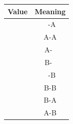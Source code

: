 \documentclass[11pt,english,BCOR10mm,DIV=14,bibliography=totoc,parskip=false,smallheadings,
    headexclude,footexclude,twoside]{pst-doc}
\begin{document}
\begin{center}
\begin{tabular}{@{}lc@{}}%
    Value & Meaning \\[2pt]\hline
    \Lnotation{-{>}>}   & \ -A \\
    \Lnotation{{<}<-{>}>} & A-A\\
    \Lnotation{{<}<-}   & A-\ \\
    \Lnotation{{>}>-}   & B-\ \\
    \Lnotation{-{<}<}   & \ -B\\
    \Lnotation{{>}>-{<}<} & B-B\\
    \Lnotation{{>}>-{>}>} & B-A\\
    \Lnotation{{<}<-{<}<} & A-B\\\hline
  \end{tabular}
\end{center}
\end{document}
